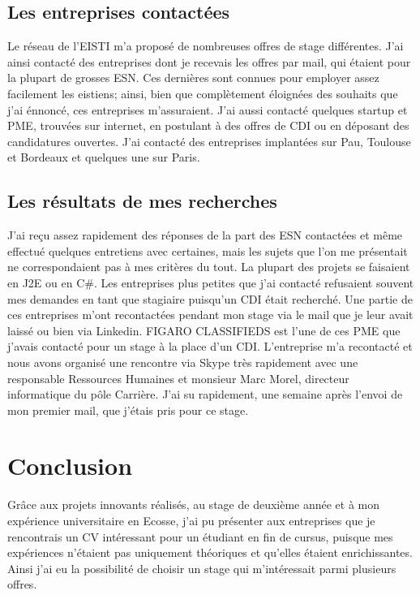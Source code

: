 \subsection{Les entreprises contactées}
Le réseau de l'EISTI m'a proposé de nombreuses offres de stage différentes.
J'ai ainsi contacté des entreprises dont je recevais les offres par mail, qui étaient pour la plupart de grosses ESN.
Ces dernières sont connues pour employer assez facilement les eistiens; ainsi, bien que complètement éloignées des souhaits que j'ai énnoncé, ces entreprises m'assuraient.
J'ai aussi contacté quelques startup et PME, trouvées sur internet, en postulant à des offres de CDI ou en déposant des candidatures ouvertes.
J'ai contacté des entreprises implantées sur Pau, Toulouse et Bordeaux et quelques une sur Paris.

\subsection{Les résultats de mes recherches}
J'ai reçu assez rapidement des réponses de la part des ESN contactées et même effectué quelques entretiens avec certaines, mais les sujets que l'on me présentait ne correspondaient pas à mes critères du tout.
La plupart des projets se faisaient en J2E ou en C\#.
Les entreprises plus petites que j'ai contacté refusaient souvent mes demandes en tant que stagiaire puisqu'un CDI était recherché.
Une partie de ces entreprises m'ont recontactées pendant mon stage via le mail que je leur avait laissé ou bien via Linkedin.
FIGARO CLASSIFIEDS est l'une de ces PME que j'avais contacté pour un stage à la place d'un CDI.
L'entreprise m'a recontacté et nous avons organisé une rencontre via Skype très rapidement avec une responsable Ressources Humaines et monsieur Marc Morel, directeur informatique du pôle Carrière.
J'ai su rapidement, une semaine après l'envoi de mon premier mail, que j'étais pris pour ce stage.


\section{Conclusion}

Grâce aux projets innovants réalisés, au stage de deuxième année et à mon expérience universitaire en Ecosse, j'ai pu présenter aux entreprises que je rencontrais un CV intéressant pour un étudiant en fin de cursus, puisque mes expériences n'étaient pas uniquement théoriques et qu'elles étaient enrichissantes.
Ainsi j'ai eu la possibilité de choisir un stage qui m'intéressait parmi plusieurs offres.
